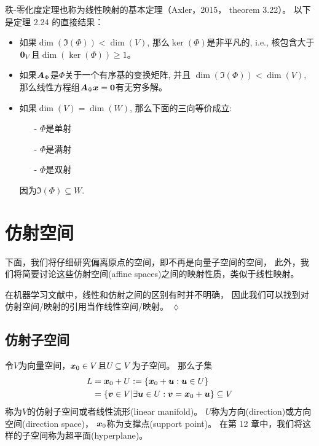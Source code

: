 秩-零化度定理也称为线性映射的基本定理（Axler，2015， theorem 3.22）。
以下是定理 2.24 的直接结果：
\begin{itemize}
    \item 如果$\dim(\Im(\Phi)) < \dim(V)$, 那么$\ker(\Phi)$是非平凡的, i.e.,
          核包含大于$\boldsymbol{0}_V$且$\dim(\ker(\Phi)) \geqslant 1$。
    \item 如果$\boldsymbol{A}_\Phi$是$\Phi$关于一个有序基的变换矩阵, 并且
          $\dim(\Im(\Phi)) < \dim(V)$,
          那么线性方程组$\boldsymbol{A}_\Phi \boldsymbol{x} = \boldsymbol{0}$有无穷多解。
    \item 如果$\dim(V) = \dim(W)$, 那么下面的三向等价成立:
          \begin{itemize}
              \item[-] $\Phi$是单射
              \item[-] $\Phi$是满射
              \item[-] $\Phi$是双射
          \end{itemize}
          因为$\Im(\Phi) \subseteq W$.
\end{itemize}

\section{仿射空间}

下面，我们将仔细研究偏离原点的空间，即不再是向量子空间的空间，
此外，我们将简要讨论这些仿射空间(affine spaces)之间的映射性质，类似于线性映射。
\begin{remark}
    在机器学习文献中，线性和仿射之间的区别有时并不明确，
    因此我们可以找到对仿射空间/映射的引用当作线性空间/映射。
    \hfill $\lozenge$
\end{remark}

\subsection{仿射子空间}

\begin{definition}[仿射子空间]
    令$V$为向量空间，$\boldsymbol{x}_0 \in V$且$U \subseteq V$ 为子空间。
    那么子集
    \begin{subequations}
        \begin{align}
            L &= \boldsymbol{x}_0 + U := \{ \boldsymbol{x}_0 + \boldsymbol{u} : \boldsymbol{u} \in U\} \\
              &= \{ \boldsymbol{v} \in V | \exists \boldsymbol{u} \in U : \boldsymbol{v} = \boldsymbol{x}_0 + \boldsymbol{u}\} \subseteq V
        \end{align}
    \end{subequations}
    称为$V$的仿射子空间或者线性流形(linear manifold)。
    $U$称为方向(direction)或方向空间(direction space)，
    $\boldsymbol{x}_0$称为支撑点(support point)。
    在第 12 章中，我们将这样的子空间称为超平面(hyperplane)。
\end{definition}

